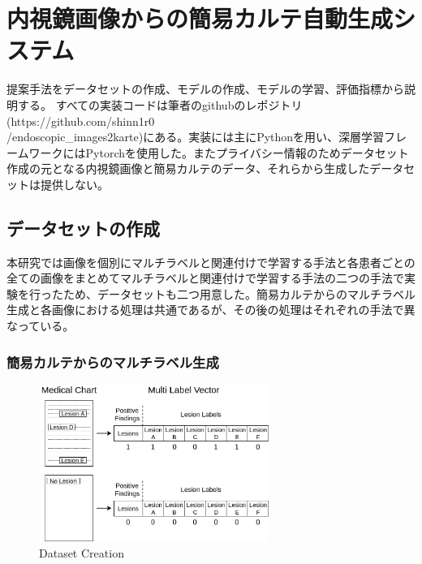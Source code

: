 \section{内視鏡画像からの簡易カルテ自動生成システム}
提案手法をデータセットの作成、モデルの作成、モデルの学習、評価指標から説明する。
すべての実装コードは筆者のgithubのレポジトリ (https://github.com/shinn1r0\\/endoscopic\_images2karte)にある。実装には主にPythonを用い、深層学習フレームワークにはPytorchを使用した。またプライバシー情報のためデータセット作成の元となる内視鏡画像と簡易カルテのデータ、それらから生成したデータセットは提供しない。
\subsection{データセットの作成}
本研究では画像を個別にマルチラベルと関連付けで学習する手法と各患者ごとの全ての画像をまとめてマルチラベルと関連付けで学習する手法の二つの手法で実験を行ったため、データセットも二つ用意した。簡易カルテからのマルチラベル生成と各画像における処理は共通であるが、その後の処理はそれぞれの手法で異なっている。
\subsubsection{簡易カルテからのマルチラベル生成}

\begin{figure}[tb]
    \begin{center}
        \includegraphics[width=75mm]{./fig/ieice1.png}
        \caption{Dataset Creation}
        \label{fig:multilabel}
    \end{center}
\end{figure}

